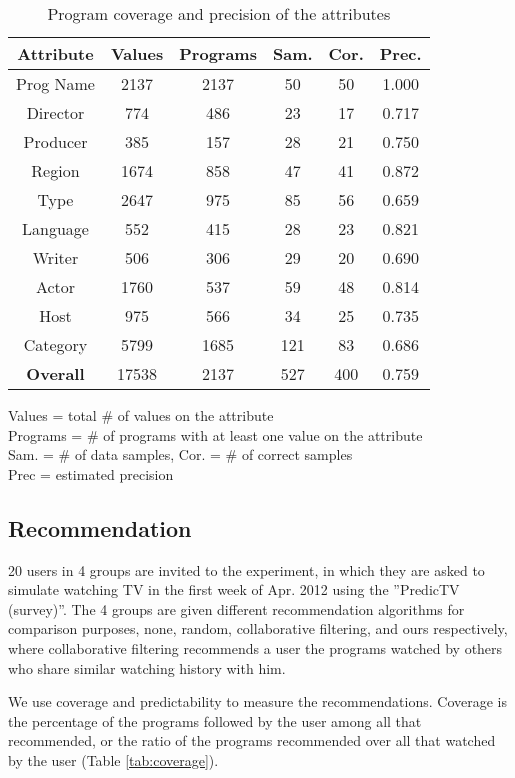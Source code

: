 \begin{table}[h]
\begin{center}
\begin{tabular}{|c|c|c|c|c|c|}
\hline
Attribute & Values & Programs & Sam. & Cor. & Prec. \\
\hline
\hline
Prog Name& 2137 & 2137 & 50 & 50 & 1.000 \\
\hline
Director & 774  & 486  & 23 & 17 & 0.717 \\
\hline
Producer & 385  & 157  & 28 & 21 & 0.750 \\
\hline
Region   & 1674 & 858  & 47 & 41 & 0.872 \\
\hline
Type     & 2647 & 975  & 85 & 56 & 0.659 \\
\hline
Language & 552  & 415  & 28 & 23 & 0.821 \\
\hline
Writer   & 506  & 306  & 29 & 20 & 0.690 \\
\hline
Actor    & 1760 & 537  & 59 & 48 & 0.814 \\
\hline
Host     & 975  & 566  & 34 & 25 & 0.735 \\
\hline
Category & 5799 & 1685 & 121& 83 & 0.686 \\
\hline
\bf{Overall}&17538 & 2137 & 527& 400& 0.759 \\
\hline
\end{tabular}
\end{center}
\tab Values = total \# of values on the attribute\\
\tab Programs = \# of programs with at least one value on the attribute\\
\tab Sam. = \# of data samples, Cor. = \# of correct samples\\
\tab Prec = estimated precision 
\caption{\label{tab:extraction}Program coverage and precision of the attributes}
\end{table}


\subsection{Recommendation}
20 users in 4 groups are invited to the experiment, in which they are asked 
to simulate watching TV in the first week of Apr. 2012 using the 
''PredicTV (survey)''. The 4 groups are 
given different recommendation algorithms for comparison purposes, none, 
random, collaborative filtering, and ours respectively, where collaborative 
filtering recommends a user the programs watched by others who share similar 
watching history with him.

We use coverage and predictability to measure the recommendations. Coverage 
is the percentage of the programs followed by the user among all that
recommended, or the ratio of the programs recommended over all that 
watched by the user (Table \ref{tab:coverage}).

